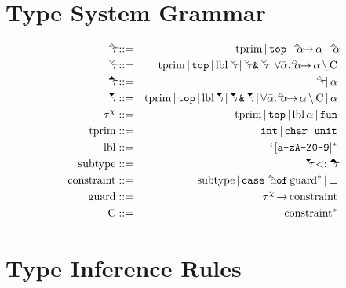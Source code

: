 \documentclass{article}
\begin{document}
\section*{Type System Grammar}

\begin{eqnarray*}
    \tauUpOpen      &::=&       \tprim
                           \gOr \gtTop
                           \gOr \alphaUp \fto \alpha
                           \gOr \alphaUp
\\
    \tauDownOpen    &::=&       \tprim
                           \gOr \gtTop
                           \gOr \lbl \tauDownOpen
                           \gOr \tauDownOpen \gtAmp \tauDownOpen
                           \gOr \forall \alphaList. \alphaUp \fto \alpha \cSeparator \constraintList
\\
    \tauUpClosed    &::=&       \tauUpOpen
                           \gOr \alpha
\\
    \tauDownClosed  &::=&       \tprim
                           \gOr \gtTop
                           \gOr \lbl \tauDownClosed
                           \gOr \tauDownClosed \gtAmp \tauDownClosed
                           \gOr \forall \alphaList. \alphaUp \fto \alpha \cSeparator \constraintList
                           \gOr \alpha
\\
    \tauChi         &::=&       \tprim
                           \gOr \gtTop
                           \gOr \lbl \alpha
                           \gOr \gtFun
\\
    \tprim          &::=&       \gtInt
                           \gOr \gtChar
                           \gOr \gtUnit
\\
    \lbl            &::=&       \gtBt [\texttt{a-zA-Z0-9}]^*
\\
    \subtype        &::=&       \tauDownClosed <: \tauUpClosed
\\
    \constraint     &::=&       \subtype
                           \gOr \gtCase \alphaUp \gtOf \guard^*
                           \gOr \gtBottom
\\
    \guard          &::=&       \tauChi \fto \constraint
\\
    \constraintList &::=&       \constraint^*
\end{eqnarray*}

\section*{Type Inference Rules}
\end{document}
